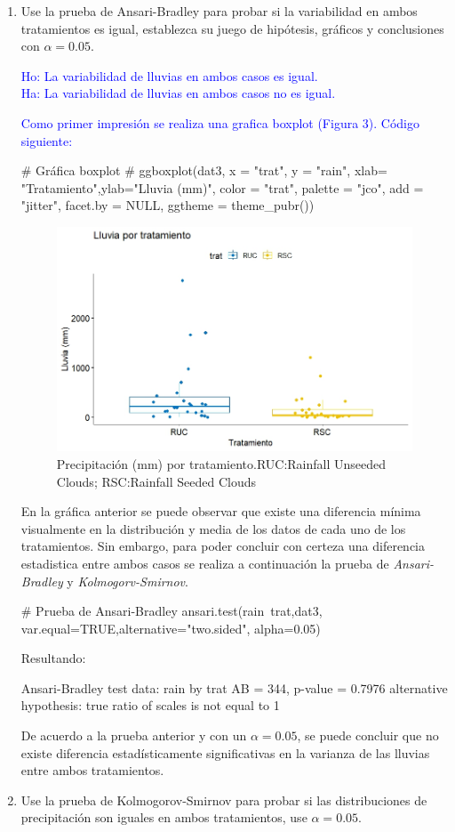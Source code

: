 \documentclass[a4paper,12pt]{article}
\begin{document}
\begin{enumerate} [label=\textbf{\alph*})]
	\item Use la prueba de Ansari-Bradley para probar si la variabilidad en ambos tratamientos es igual, establezca
	su juego de hipótesis, gráficos y conclusiones con \(\alpha =0.05\).
\begin{center}
	\textcolor{blue}{Ho: La variabilidad de lluvias en ambos casos es igual.\\
	Ha: La variabilidad de lluvias en ambos casos no es igual.}
\end{center}
\textcolor{blue}{Como primer impresión se realiza una grafica boxplot (Figura 3). Código siguiente:}
\begin{MyVerbatim}
# Gráfica boxplot #
ggboxplot(dat3, x = "trat", y = "rain",
 xlab= "Tratamiento",ylab="Lluvia (mm)", 
 color = "trat", palette = "jco",
 add = "jitter", facet.by = NULL, 
 ggtheme = theme_pubr())
\end{MyVerbatim}
\begin{figure}[H]
	\centering
	\includegraphics[width=0.7\linewidth]{lluv_box3}
	\caption[lluv_box]{Precipitación (mm) por tratamiento.RUC:Rainfall Unseeded Clouds; RSC:Rainfall Seeded Clouds}
	\label{fig:lluvbox3}
\end{figure}
En la gráfica anterior se puede observar que existe una diferencia mínima visualmente en la distribución y media de los datos de cada uno de los tratamientos. Sin embargo, para poder concluir con certeza una diferencia estadistica entre ambos casos se realiza a continuación la prueba de \textit{Ansari-Bradley} y \textit{Kolmogorv-Smirnov}.
\begin{MyVerbatim}
# Prueba de Ansari-Bradley
ansari.test(rain~trat,dat3, var.equal=TRUE,alternative="two.sided", 
alpha=0.05)
\end{MyVerbatim}
Resultando:
\begin{MyVerbatim}
	Ansari-Bradley test
data:  rain by trat
AB = 344, p-value = 0.7976
alternative hypothesis: true ratio of scales is not equal to 1
\end{MyVerbatim}
De acuerdo a la prueba anterior y con un \(\alpha=0.05\), se puede concluir que no existe diferencia estadísticamente significativas  en la varianza de las lluvias entre ambos tratamientos.
\item Use la prueba de Kolmogorov-Smirnov para probar si las distribuciones de precipitación son iguales en ambos tratamientos, use \(\alpha=0.05\).


\end{enumerate}
\end{document}
